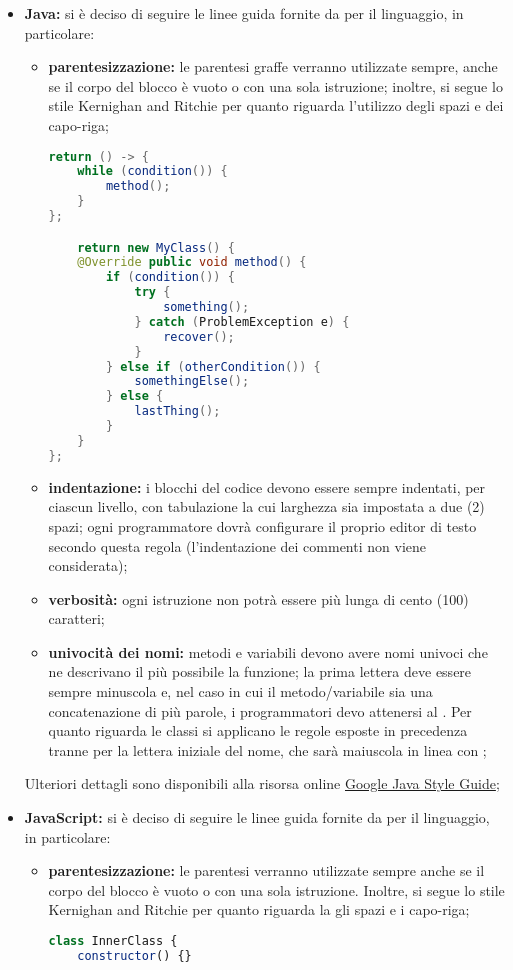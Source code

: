 					\begin{itemize}
						\item \textbf{Java:} si è deciso di seguire le linee guida fornite da  per il linguaggio, in particolare:
							\begin{itemize}
								\item \textbf{parentesizzazione:} le parentesi graffe verranno utilizzate sempre, anche se il corpo del blocco è vuoto o con una sola istruzione; inoltre, si segue lo stile Kernighan and Ritchie per quanto riguarda l'utilizzo degli spazi e dei capo-riga;
									\begin{lstlisting}[language=java,captionpos=b,caption={Esempio per la sintassi Java}]
return () -> {
	while (condition()) {
		method();
	}
};

	return new MyClass() {
	@Override public void method() {
		if (condition()) {
			try {
				something();
			} catch (ProblemException e) {
				recover();
			}
		} else if (otherCondition()) {
			somethingElse();
		} else {
			lastThing();
		}
	}
};
									\end{lstlisting}
								\item \textbf{indentazione:} i blocchi del codice devono essere sempre indentati, per ciascun livello, con tabulazione la cui larghezza sia impostata a due (2) spazi; ogni programmatore dovrà configurare il proprio editor di testo secondo questa regola (l'indentazione dei commenti non viene considerata);
								\item \textbf{verbosità:} ogni istruzione non potrà essere più lunga di cento (100) caratteri;
								\item \textbf{univocità dei nomi:} metodi e variabili devono avere nomi univoci che ne descrivano il più possibile la funzione; la prima lettera deve essere sempre minuscola e, nel caso in cui il metodo/variabile sia una concatenazione di più parole, i programmatori devo attenersi al .
								Per quanto riguarda le classi si applicano le regole esposte in precedenza tranne per la lettera iniziale del nome, che sarà maiuscola in linea con ;

							\end{itemize}
							Ulteriori dettagli sono disponibili alla risorsa online \href{https://google.github.io/styleguide/javaguide.html}{Google Java Style Guide};
						\item \textbf{JavaScript:} si è deciso di seguire le linee guida fornite da  per il linguaggio, in particolare:
							\begin{itemize}
								\item \textbf{parentesizzazione:} le parentesi verranno utilizzate sempre anche se il corpo del blocco è vuoto o con una sola istruzione. Inoltre, si segue lo stile Kernighan and Ritchie per quanto riguarda la gli spazi e i capo-riga;
								\begin{lstlisting}[language=JavaScript,captionpos=b,caption={Esempio per la sintassi JavaScript}]
class InnerClass {
	constructor() {}


\end{lstlisting}
\end{itemize}
\end{itemize}
